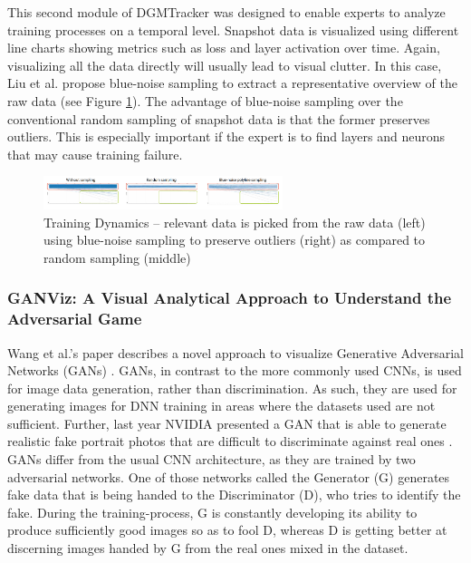 \documentclass{acmsiggraph}               %
\begin{document}
This second module of DGMTracker was designed to enable experts to analyze training processes on a temporal level.
Snapshot data is visualized using different line charts showing metrics such as loss and layer activation over time. Again, visualizing all the data directly will usually lead to visual clutter. In this case, Liu et al. propose blue-noise sampling to extract a representative overview of the raw data (see Figure \ref{fig:mengchen4}). The advantage of blue-noise sampling over the conventional random sampling of snapshot data is that the former preserves outliers. This is especially important if the expert is to find layers and neurons that may cause training failure.

\begin{figure}[!htb]
  \centering
  \includegraphics[width=2.75in]{mengchen4}
  \caption{Training Dynamics -- relevant data is picked from the raw data (left) using blue-noise sampling to preserve outliers (right) as compared to random sampling (middle) \protect\cite{Liu2018}}
  \label{fig:mengchen4}
\end{figure}

\subsubsection{GANViz: A Visual Analytical Approach to Understand the Adversarial Game}
Wang et al.'s paper describes a novel approach to visualize Generative Adversarial Networks (GANs) \protect\cite{Wang}. GANs, in contrast to the more commonly used CNNs, is used for image data generation, rather than discrimination. As such, they are used for generating images for DNN training in areas where the datasets used are not sufficient. Further, last year NVIDIA presented a GAN that is able to generate realistic fake portrait photos that are difficult to discriminate against real ones \protect\cite{KarrasNVIDIA}. 
GANs differ from the usual CNN architecture, as they are trained by two adversarial networks. One of those networks called the Generator (G) generates fake data that is being handed to the Discriminator (D), who tries to identify the fake. During the training-process, G is constantly developing its ability to produce sufficiently good images so as to fool D, whereas D is getting better at discerning images handed by G from the real ones mixed in the dataset.\\
\end{document}
